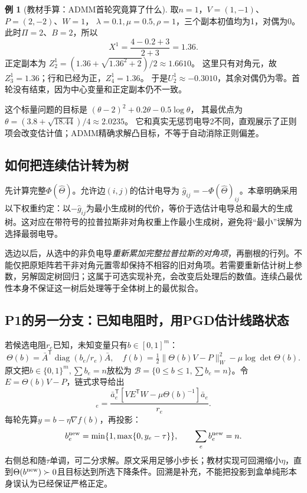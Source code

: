 \documentclass[UTF8,11pt,fontset=fandol,openany,oneside]{ctexbook}
\theoremstyle{definition}
\newtheorem{example}[theorem]{例}
\theoremstyle{remark}
\numberwithin{equation}{chapter}
\begin{document}
\begin{example}[教材手算：ADMM首轮究竟算了什么]
取$n=1$，$V=(1,-1)$、$P=(2,-2)$、$W=1$，
$\lambda=0.1,\mu=0.5,\rho=1$，三个副本初值均为1，对偶为0。此时$\Pi=2$、$B=2$，所以
\[
 X^1=\frac{4-0.2+3}{2+3}=1.36.
\]
正定副本为
$Z_2^1=(1.36+\sqrt{1.36^2+2})/2\approx1.6610$。
这里只有对角元，故$Z_3^1=1.36$；行和已经为正，$Z_4^1=1.36$。
于是$U_2^1\approx-0.3010$，其余对偶仍为零。首轮没有结束，因为中心变量和正定副本仍不一致。

这个标量问题的目标是
$(\theta-2)^2+0.2\theta-0.5\log\theta$，
其最优点为
$\theta=(3.8+\sqrt{18.44})/4\approx2.0235$。
它和真实无惩罚电导2不同，直观展示了正则项会改变估计值；ADMM精确求解凸目标，不等于自动消除正则偏差。
\end{example}

\subsection{如何把连续估计转为树}

先计算完整$\Phi(\widehat\Theta)$。允许边$(i,j)$的估计电导为
$\widehat g_{ij}=-\Phi(\widehat\Theta)_{ij}$。本章明确采用以下权重约定：以$-\widehat g_{ij}$为最小生成树的代价，等价于选估计电导总和最大的生成树。这对应在带符号的拉普拉斯非对角权重上作最小生成树，避免将“最小”误解为选择最弱电导。

选边以后，从选中的非负电导\emph{重新累加完整拉普拉斯的对角项}，再删根的行列。不能仅把原矩阵若干非对角元置零却保持不相容的旧对角项。若需要重新估计树上参数，另解固定树回归；这属于可选实现补充，会改变后处理后的数值。连续凸最优性本身不保证这一树后处理等于全体树上的最优拟合。

\subsection{P1的另一分支：已知电阻时，用PGD估计线路状态}

若候选电阻$r_e$已知，未知变量只有$b\in[0,1]^m$：
\[
 \Theta(b)=\bar A^{\mathsf T}\operatorname{diag}(b_e/r_e)\bar A,\quad
 f(b)=\tfrac12\|\Theta(b)V-P\|_W^2-\mu\log\det\Theta(b).
\]
原文把$b\in\{0,1\}^m,\sum b_e=n$放松为
$\mathcal B=\{0\leq b\leq1,\sum b_e=n\}$。令$E=\Theta(b)V-P$，链式求导给出
\begin{equation}
 [\nabla f(b)]_e=
 \frac{\bar a_e^{\mathsf T}
 [VE^{\mathsf T}W-\mu\Theta(b)^{-1}]
 \bar a_e}{r_e}.
 \label{eq:tb-P1-PGD}
\end{equation}
每轮先算$y=b-\eta\nabla f(b)$，再投影：
\[
 b_e^{\rm new}=\min\{1,\max\{0,y_e-\tau\}\},\qquad
 \sum_e b_e^{\rm new}=n.
\]
右侧总和随$\tau$单调，可二分求解。原文采用足够小步长；教材实现可回溯缩小$\eta$，直到$\Theta(b^{\rm new})\succ0$且目标达到所选下降条件。回溯是补充，不能把投影到盒单纯形本身误认为已经保证严格正定。
\end{document}

